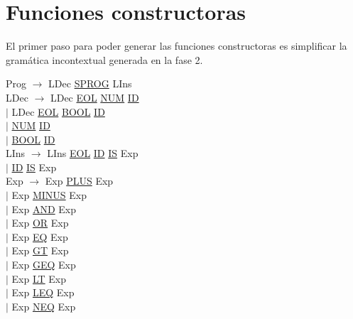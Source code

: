 \documentclass[\main/MemoriaPL.tex]{subfiles}
\begin{document}
  \section{Funciones constructoras}
    \par
    El primer paso para poder generar las funciones constructoras es simplificar
    la gramática incontextual generada en la fase 2.

    \bigskip
    \par
    Prog $\rightarrow$ LDec \underline{SPROG} LIns\\
    LDec $\rightarrow$ LDec \underline{EOL} \underline{NUM} \underline{ID}\\
    \hspace{13mm}$\mid$ LDec \underline{EOL} \underline{BOOL} \underline{ID}\\
    \hspace{13mm}$\mid$ \underline{NUM} \underline{ID}\\
    \hspace{13mm}$\mid$ \underline{BOOL} \underline{ID}\\
    LIns $\rightarrow$ LIns \underline{EOL} \underline{ID} \underline{IS} Exp\\
    \hspace{12mm}$\mid$ \underline{ID} \underline{IS} Exp\\
    Exp $\rightarrow$ Exp \underline{PLUS} Exp\\
    \hspace{11mm}$\mid$ Exp \underline{MINUS} Exp\\
    \hspace{11mm}$\mid$ Exp \underline{AND} Exp\\
    \hspace{11mm}$\mid$ Exp \underline{OR} Exp\\
    \hspace{11mm}$\mid$ Exp \underline{EQ} Exp\\
    \hspace{11mm}$\mid$ Exp \underline{GT} Exp\\
    \hspace{11mm}$\mid$ Exp \underline{GEQ} Exp\\
    \hspace{11mm}$\mid$ Exp \underline{LT} Exp\\
    \hspace{11mm}$\mid$ Exp \underline{LEQ} Exp\\
    \hspace{11mm}$\mid$ Exp \underline{NEQ} Exp\\
\end{document}
